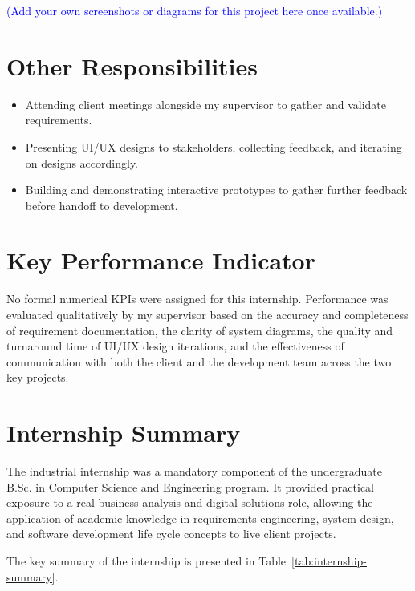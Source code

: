 \textcolor{blue}{\small (Add your own screenshots or diagrams for this project here once available.)}

\section{Other Responsibilities}
\begin{itemize}
    \item Attending client meetings alongside my supervisor to gather and validate requirements.
    \item Presenting UI/UX designs to stakeholders, collecting feedback, and iterating on designs accordingly.
    \item Building and demonstrating interactive prototypes to gather further feedback before handoff to development.
\end{itemize}

\section{Key Performance Indicator}
\par No formal numerical KPIs were assigned for this internship. Performance was evaluated qualitatively by my supervisor based on the accuracy and completeness of requirement documentation, the clarity of system diagrams, the quality and turnaround time of UI/UX design iterations, and the effectiveness of communication with both the client and the development team across the two key projects.

\section{Internship Summary}

\par The industrial internship was a mandatory component of the undergraduate B.Sc. in Computer Science and Engineering program. It provided practical exposure to a real business analysis and digital-solutions role, allowing the application of academic knowledge in requirements engineering, system design, and software development life cycle concepts to live client projects.

\par The key summary of the internship is presented in Table~\ref{tab:internship-summary}.

